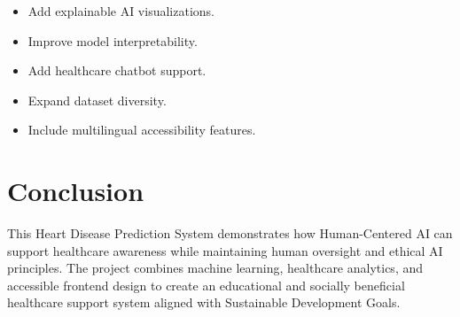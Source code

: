 \documentclass[12pt]{article}
\begin{document}
\begin{itemize}
    \item Add explainable AI visualizations.
    \item Improve model interpretability.
    \item Add healthcare chatbot support.
    \item Expand dataset diversity.
    \item Include multilingual accessibility features.
\end{itemize}

\section*{Conclusion}

This Heart Disease Prediction System demonstrates how Human-Centered AI can support healthcare awareness while maintaining human oversight and ethical AI principles. The project combines machine learning, healthcare analytics, and accessible frontend design to create an educational and socially beneficial healthcare support system aligned with Sustainable Development Goals.
\end{document}
